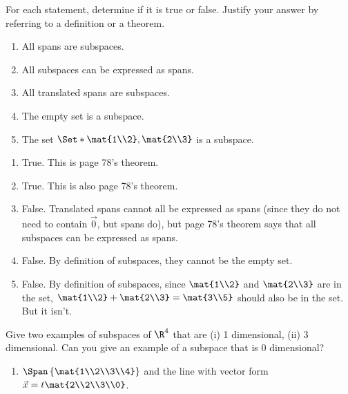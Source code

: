 \begin{exercises}
\begin{problist}
		\prob  For each statement, determine if it is true or false.
		Justify your answer by referring to a definition or a theorem.
		\begin{enumerate}
			\item All spans are subspaces.
			\item All subspaces can be expressed as spans.
			\item All translated spans are subspaces.
			\item The empty set is a subspace.
			\item The set $\Set*{\mat{1\\2}, \mat{2\\3}}$ is a subspace.
		\end{enumerate}
		\begin{solution}
			\begin{enumerate}
				\item True. This is page 78's theorem.

				\item True. This is also page 78's theorem.

				\item False. Translated spans cannot all be expressed as spans (since they do not need to contain $\vec 0$, but spans do), but page 78's theorem says that all subspaces can be expressed as spans.

				\item False. By definition of subspaces, they cannot be the empty set.

				\item False. By definition of subspaces, since $\mat{1\\2}$ and $\mat{2\\3}$ are in the set, $\mat{1\\2}+\mat{2\\3}=\mat{3\\5}$ should also be in the set. But it isn't.
\end{enumerate}
		\end{solution}

		\prob Give two examples of subspaces of $\R^4$ that are (i) 1 dimensional, (ii)
		3 dimensional. Can you give an example of a subspace that is 0 dimensional? 
		\begin{solution}
			\begin{enumerate}[label=(\roman*)]
				\item $\Span\left\{\mat{1\\2\\3\\4}\right\}$ and the line with vector form $\vec x=t\mat{2\\2\\3\\0}$.


\end{enumerate}
\end{solution}
\end{problist}
\end{exercises}
